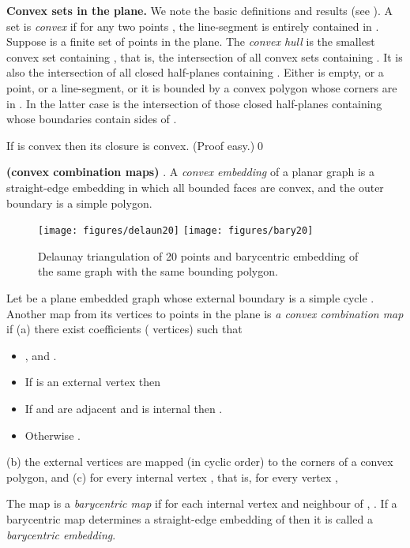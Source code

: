 \numpara
\label{convexity} {\bf Convex sets in the plane.}
We note the basic definitions and results (see \cite{brondstred}).
A set  is {\em convex} if for any two points ,
the line-segment  is entirely contained in .  Suppose  is
a finite set of points in the plane.
The {\em convex hull} 
is the smallest convex set containing ,
that is, the intersection of all convex sets containing .
It is also the intersection of all closed half-planes containing
.  Either  is empty, or a point, or a
line-segment, or it is bounded by a convex polygon
whose corners are in .  In the latter case  is
the intersection of those closed half-planes containing
 whose boundaries contain sides of .

\begin{proposition}
\label{closure convex} If  is convex then its closure
 is convex. (Proof easy.)\qed
\end{proposition}



\begin{definition}
\label{convex combination map} {\bf (convex combination maps)} {\rm \cite{floater03}}.
A {\em convex embedding} of a planar graph  is a straight-edge
embedding
in which all bounded faces are convex, and the outer boundary
is a simple polygon.

\begin{figure}
\centerline{
\texttt{[image: figures/delaun20]}\hspace*{.5in}
\texttt{[image: figures/bary20]}\hspace*{.5in}\ \ 
}
\caption{Delaunay triangulation of 20 points and barycentric
embedding of the same graph with the same bounding
polygon.}
\label{delaun20.fig}
\end{figure}


Let  be a plane embedded graph whose external boundary is
a simple cycle .
Another map  from its vertices to
points in the plane is {\em a convex combination map} if
{\rm (a)} there exist coefficients  ( vertices) such that
\begin{itemize}
\item
,
and
.
\item
If  is an external vertex then 
\item
If  and  are adjacent and  is internal
then .
\item
Otherwise .
\end{itemize}

{\rm (b)}
the external
vertices are mapped (in cyclic order) to the corners
of a convex polygon, and {\rm (c)} for
every internal vertex , that is, for every vertex ,


The map is a {\em barycentric map} if
for each internal vertex  and neighbour  of
, .
If a barycentric map determines a straight-edge embedding
of  then it is called a {\em barycentric embedding}.
\end{definition}

